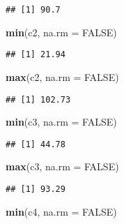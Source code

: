 \documentclass[
]{article}
\newenvironment{Shaded}{\begin{snugshade}}{\end{snugshade}}
\newcommand{\AttributeTok}[1]{\textcolor[rgb]{0.13,0.29,0.53}{#1}}
\newcommand{\ConstantTok}[1]{\textcolor[rgb]{0.56,0.35,0.01}{#1}}
\newcommand{\FunctionTok}[1]{\textcolor[rgb]{0.13,0.29,0.53}{\textbf{#1}}}
\newcommand{\NormalTok}[1]{#1}
\begin{document}
\begin{verbatim}
## [1] 90.7
\end{verbatim}

\begin{Shaded}
\begin{Highlighting}[]
\FunctionTok{min}\NormalTok{(c2, }\AttributeTok{na.rm =} \ConstantTok{FALSE}\NormalTok{)}
\end{Highlighting}
\end{Shaded}

\begin{verbatim}
## [1] 21.94
\end{verbatim}

\begin{Shaded}
\begin{Highlighting}[]
\FunctionTok{max}\NormalTok{(c2, }\AttributeTok{na.rm =} \ConstantTok{FALSE}\NormalTok{)}
\end{Highlighting}
\end{Shaded}

\begin{verbatim}
## [1] 102.73
\end{verbatim}

\begin{Shaded}
\begin{Highlighting}[]
\FunctionTok{min}\NormalTok{(c3, }\AttributeTok{na.rm =} \ConstantTok{FALSE}\NormalTok{)}
\end{Highlighting}
\end{Shaded}

\begin{verbatim}
## [1] 44.78
\end{verbatim}

\begin{Shaded}
\begin{Highlighting}[]
\FunctionTok{max}\NormalTok{(c3, }\AttributeTok{na.rm =} \ConstantTok{FALSE}\NormalTok{)}
\end{Highlighting}
\end{Shaded}

\begin{verbatim}
## [1] 93.29
\end{verbatim}

\begin{Shaded}
\begin{Highlighting}[]
\FunctionTok{min}\NormalTok{(c4, }\AttributeTok{na.rm =} \ConstantTok{FALSE}\NormalTok{)}
\end{Highlighting}
\end{Shaded}
\end{document}
